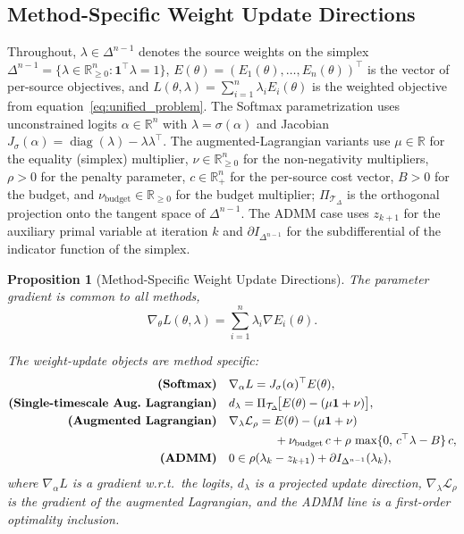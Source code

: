 \documentclass[preprint,12pt,authoryear]{elsarticle}
\newtheorem{proposition}[theorem]{Proposition}
\begin{document}
\subsection{Method-Specific Weight Update Directions}

Throughout, $\lambda \in \Delta^{n-1}$ denotes the source weights on the simplex
$\Delta^{n-1} = \{\lambda \in \mathbb{R}^n_{\geq 0} : \mathbf{1}^\top \lambda = 1\}$,
$E(\theta) = (E_1(\theta), \dots, E_n(\theta))^\top$ is the vector of per-source
objectives, and $L(\theta, \lambda) = \sum_{i=1}^n \lambda_i E_i(\theta)$ is the
weighted objective from equation~\ref{eq:unified_problem}. The Softmax parametrization
uses unconstrained logits $\alpha \in \mathbb{R}^n$ with $\lambda = \sigma(\alpha)$
and Jacobian $J_\sigma(\alpha) = \operatorname{diag}(\lambda) - \lambda\lambda^\top$.
The augmented-Lagrangian variants use $\mu \in \mathbb{R}$ for the equality
(simplex) multiplier, $\nu \in \mathbb{R}^n_{\geq 0}$ for the non-negativity
multipliers, $\rho > 0$ for the penalty parameter, $c \in \mathbb{R}^n_{+}$ for
the per-source cost vector, $B > 0$ for the budget, and $\nu_{\text{budget}}
\in \mathbb{R}_{\geq 0}$ for the budget multiplier;
$\Pi_{\mathcal{T}_\Delta}$ is the orthogonal projection onto the tangent space
of $\Delta^{n-1}$. The ADMM case uses $z_{k+1}$ for the auxiliary primal variable
at iteration $k$ and $\partial I_{\Delta^{n-1}}$ for the subdifferential of the
indicator function of the simplex.

\begin{proposition}[Method-Specific Weight Update Directions]\label{thm:unified_gradient}
The parameter gradient is common to all methods,
\begin{equation}
\label{eq:grad_theta}
    \nabla_\theta L(\theta, \lambda) = \sum_{i=1}^n \lambda_i \nabla E_i(\theta).
\end{equation}

The weight-update objects are method specific:
\begin{align}
\text{\textbf{(Softmax)}} \quad & \nabla_\alpha L = J_\sigma(\alpha)^\top E(\theta), \label{eq:gw_softmax}\\
\text{\textbf{(Single-timescale Aug.\ Lagrangian)}} \quad & d_\lambda = \Pi_{\mathcal{T}_\Delta}\!\bigl[E(\theta) - (\mu\mathbf{1} + \nu)\bigr], \label{eq:gw_single}\\
\text{\textbf{(Augmented Lagrangian)}} \quad & \nabla_\lambda \mathcal{L}_\rho = E(\theta) - (\mu\mathbf{1} + \nu) \nonumber\\
    &\hphantom{\nabla_\lambda \mathcal{L}_\rho ={}} + \nu_{\text{budget}}\, c + \rho\,\max\{0,\,c^\top\lambda - B\}\,c, \label{eq:gw_auglag}\\
\text{\textbf{(ADMM)}} \quad & 0 \in \rho(\lambda_k - z_{k+1}) + \partial I_{\Delta^{n-1}}(\lambda_k), \label{eq:gw_admm}
\end{align}
where $\nabla_\alpha L$ is a gradient w.r.t.\ the logits, $d_\lambda$ is a
projected update direction, $\nabla_\lambda \mathcal{L}_\rho$ is the gradient of
the augmented Lagrangian, and the ADMM line is a first-order optimality
\emph{inclusion}.
\end{proposition}
\end{document}
